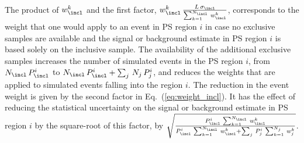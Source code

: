 The product of $w_{\incl}^{k}$ and the first factor, $w_{\incl}^{k} \, \frac{L \, \sigma_{\incl}}{\sum_{k=1}^{N_{\incl}} \, w_{\incl}^{k}}$,
corresponds to the weight that one would apply to an event in PS region $i$ 
in case no exclusive samples are available and the signal or background estimate in PS region $i$ is based solely on the inclusive sample.
The availability of the additional exclusive samples increases the number of simulated events in the PS region $i$, 
from $N_{\incl} \, P_{\incl}^{i}$ to $N_{\incl} \, P_{\incl}^{i} + \sum_{j} \, N_{j} \, P_{j}^{i}$,
and reduces the weights that are applied to simulated events falling into the region $i$.
The reduction in the event weight is given by the second factor in Eq.~(\ref{eq:weight_incl}).
It has the effect of reducing the statistical uncertainty on the signal or background estimate in PS region $i$
by the square-root of this factor,
\ie by $\sqrt{\frac{P_{\incl}^{i} \, \sum_{k=1}^{N_{\incl}} \, w_{\incl}^{k}}{P_{\incl}^{i} \, \sum_{k=1}^{N_{\incl}} \, w_{\incl}^{k} + \sum_{j} \, P_{j}^{i} \, \sum_{k=1}^{N_{j}} \, w_{j}^{k}}}$.
